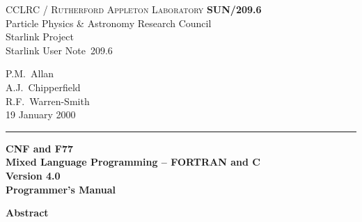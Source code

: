 \documentclass[twoside,11pt]{article}
\newcommand{\stardoccategory}  {Starlink User Note}
\newcommand{\stardocinitials}  {SUN}
\newcommand{\stardocnumber}    {209.6}
\newcommand{\stardocauthors}   {P.M.\ Allan\\
                                A.J.\ Chipperfield\\
                                R.F.\ Warren-Smith}
\newcommand{\stardocdate}      {19 January 2000}
\newcommand{\stardoctitle}     {CNF and F77 \\ [1ex]
                                Mixed Language Programming -- FORTRAN and C}
\newcommand{\stardocversion}   {Version 4.0}
\newcommand{\stardocmanual}    {Programmer's Manual}
\newcommand{\stardocname}{\stardocinitials /\stardocnumber}
\newenvironment{latexonly}{}{}
\renewcommand{\_}{\texttt{\symbol{95}}}
\begin{document}
\thispagestyle{empty}

\begin{latexonly}
   CCLRC / \textsc{Rutherford Appleton Laboratory} \hfill \textbf{\stardocname}\\
   {\large Particle Physics \& Astronomy Research Council}\\
   {\large Starlink Project\\}
   {\large \stardoccategory\ \stardocnumber}
   \begin{flushright}
   \stardocauthors\\
   \stardocdate
   \end{flushright}
   \vspace{-4mm}
   \rule{\textwidth}{0.5mm}
   \vspace{5mm}
   \begin{center}
   {\Huge\textbf{\stardoctitle \\ [2.5ex]}}
   {\LARGE\textbf{\stardocversion \\ [4ex]}}
   {\Huge\textbf{\stardocmanual}}
   \end{center}
   \vspace{5mm}


   \vspace{10mm}
   \begin{center}
      {\Large\textbf{Abstract}}
   \end{center}
\end{latexonly}
\end{document}
